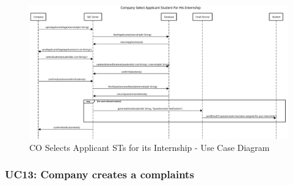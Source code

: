 \begin{figure}[H]
    \centering
    \includegraphics[width=1.0\textwidth]{Images/UC_12.pdf}
    \caption{CO Selects Applicant STs for its Internship - Use Case Diagram}
    \label{fig:use-case-diagram-12}
\end{figure}


\subsubsection{UC13: Company creates a complaints}
\label{subsubsec:company-creates-a-complaints}

